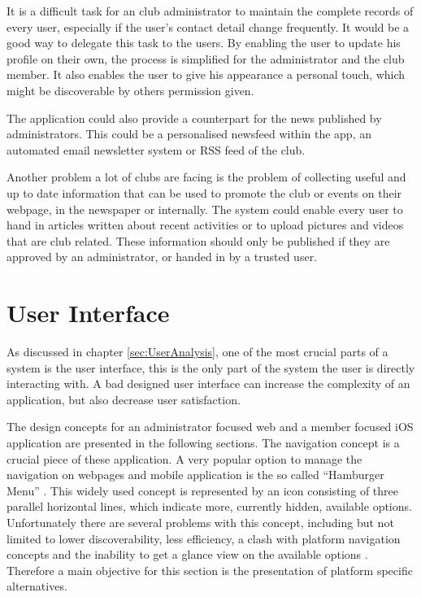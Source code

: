 It is a difficult task for an club administrator to maintain the complete records of every user, especially if the user's contact detail change frequently. It would be a good way to delegate this task to the users. By enabling the user to update his profile on their own, the process is simplified for the administrator and the club member. It also enables the user to give his appearance a personal touch, which might be discoverable by others permission given.

The application could also provide a counterpart for the news published by administrators. This could be a personalised newsfeed within the app, an automated email newsletter system or \gls{RSS} feed of the club.

Another problem a lot of clubs are facing is the problem of collecting useful and up to date information that can be used to promote the club or events on their webpage, in the newspaper or internally. The system could enable every user to hand in articles written about recent activities or to upload pictures and videos that are club related. These information should only be published if they are approved by an administrator, or handed in by a trusted user.

\section{User Interface} %

As discussed in chapter \vref{sec:UserAnalysis}, one of the most crucial parts of a system is the user interface, this is the only part of the system the user is directly interacting with. A bad designed user interface can increase the complexity of an application, but also decrease user satisfaction.

The design concepts for an administrator focused web and a member focused iOS application are presented in the following sections. The navigation concept is a crucial piece of these application. A very popular option to manage the navigation on webpages and mobile application is the so called \enquote{Hamburger Menu} \cite{Abreu:2014aa}. This widely used concept is represented by an icon consisting of three parallel horizontal lines, which indicate more, currently hidden, available options. Unfortunately there are several problems with this concept, including but not limited to lower discoverability, less efficiency, a clash with platform navigation concepts and the inability to get a glance view on the available options \cite{Abreu:2014aa}. Therefore a main objective for this section is the presentation of platform specific alternatives.

